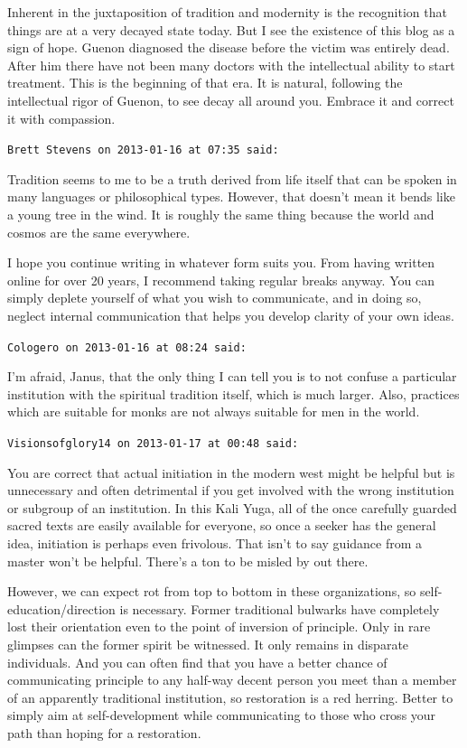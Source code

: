 \begin{footnotesize}
\begin{sffamily}
Inherent in the juxtaposition of tradition and modernity is the recognition that things are at a very decayed state today. But I see the existence of this blog as a sign of hope. Guenon diagnosed the disease before the victim was entirely dead. After him there have not been many doctors with the intellectual ability to start treatment. This is the beginning of that era. It is natural, following the intellectual rigor of Guenon, to see decay all around you. Embrace it and correct it with compassion.

\hfill

\texttt{Brett Stevens on 2013-01-16 at 07:35 said:}

Tradition seems to me to be a truth derived from life itself that can be spoken in many languages or philosophical types. However, that doesn't mean it bends like a young tree in the wind. It is roughly the same thing because the world and cosmos are the same everywhere.

I hope you continue writing in whatever form suits you. From having written online for over 20 years, I recommend taking regular breaks anyway. You can simply deplete yourself of what you wish to communicate, and in doing so, neglect internal communication that helps you develop clarity of your own ideas.

\hfill

\texttt{Cologero on 2013-01-16 at 08:24 said:}

I'm afraid, Janus, that the only thing I can tell you is to not confuse a particular institution with the spiritual tradition itself, which is much larger. Also, practices which are suitable for monks are not always suitable for men in the world.

\hfill

\texttt{Visionsofglory14 on 2013-01-17 at 00:48 said:}

You are correct that actual initiation in the modern west might be helpful but is unnecessary and often detrimental if you get involved with the wrong institution or subgroup of an institution. In this Kali Yuga, all of the once carefully guarded sacred texts are easily available for everyone, so once a seeker has the general idea, initiation is perhaps even frivolous. That isn't to say guidance from a master won't be helpful. There's a ton to be misled by out there.

However, we can expect rot from top to bottom in these organizations, so self-education/direction is necessary. Former traditional bulwarks have completely lost their orientation even to the point of inversion of principle. Only in rare glimpses can the former spirit be witnessed. It only remains in disparate individuals. And you can often find that you have a better chance of communicating principle to any half-way decent person you meet than a member of an apparently traditional institution, so restoration is a red herring. Better to simply aim at self-development while communicating to those who cross your path than hoping for a restoration.


\end{sffamily}
\end{footnotesize}
